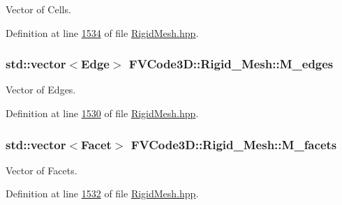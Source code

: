 Vector of Cells. 



Definition at line \hyperlink{RigidMesh_8hpp_source_l01534}{1534} of file \hyperlink{RigidMesh_8hpp_source}{Rigid\+Mesh.\+hpp}.

\subsubsection[{\texorpdfstring{M\+\_\+edges}{M_edges}}]{\setlength{\rightskip}{0pt plus 5cm}std\+::vector$<${\bf Edge}$>$ F\+V\+Code3\+D\+::\+Rigid\+\_\+\+Mesh\+::\+M\+\_\+edges\hspace{0.3cm}{\ttfamily [protected]}}\hypertarget{classFVCode3D_1_1Rigid__Mesh_a4c6287c9256a92c13486048c372fe487}{}\label{classFVCode3D_1_1Rigid__Mesh_a4c6287c9256a92c13486048c372fe487}


Vector of Edges. 



Definition at line \hyperlink{RigidMesh_8hpp_source_l01530}{1530} of file \hyperlink{RigidMesh_8hpp_source}{Rigid\+Mesh.\+hpp}.

\subsubsection[{\texorpdfstring{M\+\_\+facets}{M_facets}}]{\setlength{\rightskip}{0pt plus 5cm}std\+::vector$<${\bf Facet}$>$ F\+V\+Code3\+D\+::\+Rigid\+\_\+\+Mesh\+::\+M\+\_\+facets\hspace{0.3cm}{\ttfamily [protected]}}\hypertarget{classFVCode3D_1_1Rigid__Mesh_a62757eb1d9c54b4421880b3c271b4c3b}{}\label{classFVCode3D_1_1Rigid__Mesh_a62757eb1d9c54b4421880b3c271b4c3b}


Vector of Facets. 



Definition at line \hyperlink{RigidMesh_8hpp_source_l01532}{1532} of file \hyperlink{RigidMesh_8hpp_source}{Rigid\+Mesh.\+hpp}.

